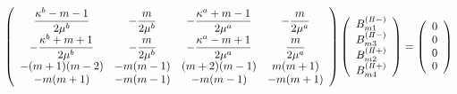 \begin{align}
	\left(
	\begin{array}{cccc}
		{\displaystyle\frac{ \kappa^b-m-1}{2\mu^{b}}}& {\displaystyle-\frac{m}{2\mu^{b}}} &
		{\displaystyle-\frac{\kappa^a+m-1}{2\mu^{a}}} & {\displaystyle-\frac{m}{2\mu^{a}}} \\
		{\displaystyle-\frac{\kappa^b+m+1}{2\mu^{b}}} & {\displaystyle-\frac{m}{2\mu^{b}}} &
		{\displaystyle-\frac{\kappa^a-m+1}{2\mu^{a}}} & {\displaystyle \frac{m}{2\mu^{a}}} \\
		-(m+1)(m-2) & -m(m-1) & (m+2)(m-1) & m(m+1) \\
		-m(m+1) & -m(m-1) & -m(m-1) & -m(m+1)\\
	\end{array}
	\right)
	\left(
	\begin{array}{c}
		B_{m1}^{(I\hspace{-.15em}I-)} \\
	 	B_{m3}^{(I\hspace{-.15em}I-)} \\
		B_{m2}^{(I\hspace{-.15em}I+)}\\
	 	B_{m4}^{(I\hspace{-.15em}I+)} \\
	\end{array}
	\right)
	=
	\left(
	\begin{array}{c}
		0 \\
	 	0 \\
		0 \\
	 	0 \\
	\end{array}
	\right)
\end{align}

